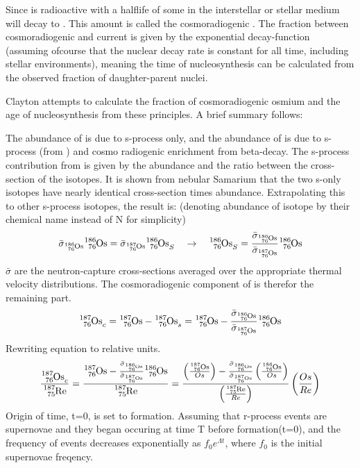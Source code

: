 Since  is radioactive with a halflife of  some  in the interstellar or stellar medium will decay to . This amount is called the cosmoradiogenic . The fraction between cosmoradiogenic  and current  is given by the exponential decay-function (assuming ofcourse that the nuclear decay rate is constant for all time, including stellar environments), meaning the time of nucleosynthesis can be calculated from the observed fraction of daughter-parent nuclei.

Clayton attempts to calculate the fraction of cosmoradiogenic osmium and the age of nucleosynthesis from these principles.
A brief summary follows:

The abundance of  is due to s-process only, and the abundance of  is due to s-process (from ) and cosmo radiogenic enrichment from  beta-decay.
The s-process contribution from  is given by the  abundance and the ratio between the cross-section of the isotopes. It is shown from nebular Samarium that the two s-only isotopes have nearly identical cross-section times abundance. Extrapolating this to other s-process isotopes, the result is:
(denoting abundance of isotope by their chemical name instead of N for simplicity)
\begin{equation}
  \bar{\sigma}_{\os{186}}{\os{186}} = \bar{\sigma}_{\os{187}}{\os{186}_S}
  \quad \rightarrow \quad
  {\os{186}_S} = \frac{\bar{\sigma}_{\os{186}}}{\bar{\sigma}_{\os{187}}}{\os{186}}
\end{equation}
$\bar{\sigma}$ are the neutron-capture cross-sections averaged over the appropriate thermal velocity distributions.
The cosmoradiogenic component of  is therefor the remaining part.
\begin{equation}
  \os{187}_c = \os{187} - \os{187}_s = \os{187} - \frac{\bar{\sigma}_{\os{186}}}{\bar{\sigma}_{\os{187}}}{\os{186}}
\end{equation}
Rewriting equation to relative units.
\begin{equation}
  \frac{\os{187}_c}{\re{187}} = \frac{\os{187} - \frac{\bar{\sigma}_{\os{186}}}{\bar{\sigma}_{\os{187}}}{\os{186}}}{\re{187}} =
  \frac{
    \left(\frac{\os{187}}{Os}\right) -
    \frac{\bar{\sigma}_{\os{186}}}{\bar{\sigma}_{\os{187}}}
    \left(\frac{\os{186}}{Os}\right)
  }{
    \left(\frac{\re{187}}{Re}\right)
  }
  \left(\frac{Os}{Re}\right)
\end{equation}
Origin of time, t=0, is set to \sos formation. Assuming that r-process events are supernovae and they began occuring at time T before \sos formation(t=0), and the frequency of events decreases exponentially as $f_0e^{\Lambda t}$, where $f_0$ is the initial supernovae freqency.
